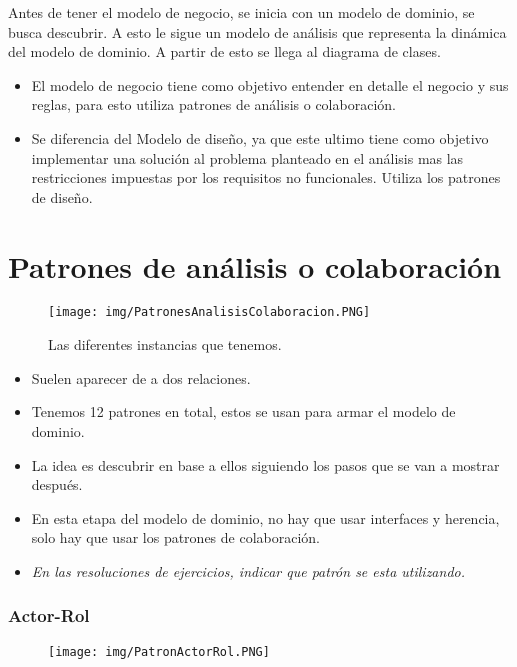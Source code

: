Antes de tener el modelo de negocio, se inicia con un modelo de dominio, se busca descubrir. A esto le sigue un modelo de análisis que representa la dinámica del modelo de dominio. A partir de esto se llega al diagrama de clases.

\begin{itemize}
\item El modelo de negocio tiene como objetivo entender en detalle el negocio y sus reglas, para esto utiliza patrones de análisis o colaboración.
\item Se diferencia del Modelo de diseño, ya que este ultimo tiene como objetivo implementar una solución al problema planteado en el análisis mas las restricciones impuestas por los requisitos no funcionales. Utiliza los patrones de diseño.
\end{itemize}


\section{Patrones de análisis o colaboración}

\begin{figure}[!htb]
    \centering
    \texttt{[image: img/PatronesAnalisisColaboracion.PNG]}
    \caption{Las diferentes instancias que tenemos.}
\end{figure}

\begin{itemize}
\item Suelen aparecer de a dos relaciones. 
\item Tenemos 12 patrones en total, estos se usan para armar el modelo de dominio.
\item La idea es descubrir en base a ellos siguiendo los pasos que se van a mostrar después.
\item En esta etapa del modelo de dominio, no hay que usar interfaces y herencia, solo hay que usar los patrones de colaboración.
\item \textit{En las resoluciones de ejercicios, indicar que patrón se esta utilizando.} 
\end{itemize}

\newpage
\subsubsection*{Actor-Rol}
\begin{figure}[!htb]
    \centering
    \texttt{[image: img/PatronActorRol.PNG]}
\end{figure}

